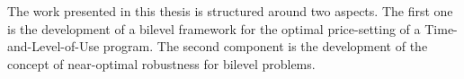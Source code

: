 


\label{chap:WorkSynthesis}

The work presented in this thesis is structured around two aspects.
The first one is the development of a bilevel framework for the optimal
price-setting of a Time-and-Level-of-Use program. The second component is
the development of the concept of near-optimal robustness for bilevel problems.
